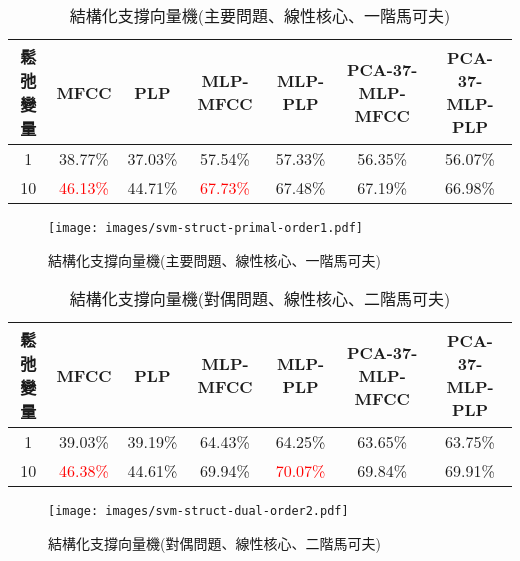     \begin{table}[htb] 
      \begin{center}
	\scalebox{0.75} 
	{
	  \begin{tabular}{|c|c|c|c|c|c|c|}
	  \hline
	  鬆弛變量 & MFCC & PLP & MLP-MFCC & MLP-PLP & PCA-37-MLP-MFCC & PCA-37-MLP-PLP \\
	  \hline 
	  1 & 38.77\% & 37.03\% & 57.54\% & 57.33\% & 56.35\% & 56.07\% \\ 
	  \hline 
	  10 & \textcolor{red}{46.13\%} & 44.71\% & \textcolor{red}{67.73\%} & 67.48\% & 67.19\% & 66.98\% \\
	  \hline
	  \end{tabular} 
	}
      \end{center}
      \caption{結構化支撐向量機(主要問題、線性核心、一階馬可夫)}
      \label{tab:svm_struct_primal_order1}
    \end{table}
    
    \begin{figure}
      \begin{center}
	\texttt{[image: images/svm-struct-primal-order1.pdf]}
      \end{center}
      \caption{結構化支撐向量機(主要問題、線性核心、一階馬可夫)}
      \label{fig:svm_struct_primal_order1}
    \end{figure}

    \newpage

    \begin{table}[htb]
      \begin{center}
	\scalebox{0.75} 
	{
	  \begin{tabular}{|c|c|c|c|c|c|c|}
	  \hline
	  鬆弛變量 & MFCC & PLP & MLP-MFCC & MLP-PLP & PCA-37-MLP-MFCC & PCA-37-MLP-PLP \\
	  \hline 
	  1 & 39.03\% & 39.19\% & 64.43\% & 64.25\% & 63.65\% & 63.75\% \\ 
	  \hline 
	  10 & \textcolor{red}{46.38\%} & 44.61\% & 69.94\% & \textcolor{red}{70.07\%} & 69.84\% & 69.91\% \\
	  \hline
	  \end{tabular} 
	}
      \end{center}
      \caption{結構化支撐向量機(對偶問題、線性核心、二階馬可夫)}
      \label{tab:svm_struct_dual_order2}
    \end{table}
    
    \begin{figure}
      \begin{center}
	\texttt{[image: images/svm-struct-dual-order2.pdf]}
      \end{center}
      \caption{結構化支撐向量機(對偶問題、線性核心、二階馬可夫)}
      \label{fig:svm_struct_dual_order2}
    \end{figure}

